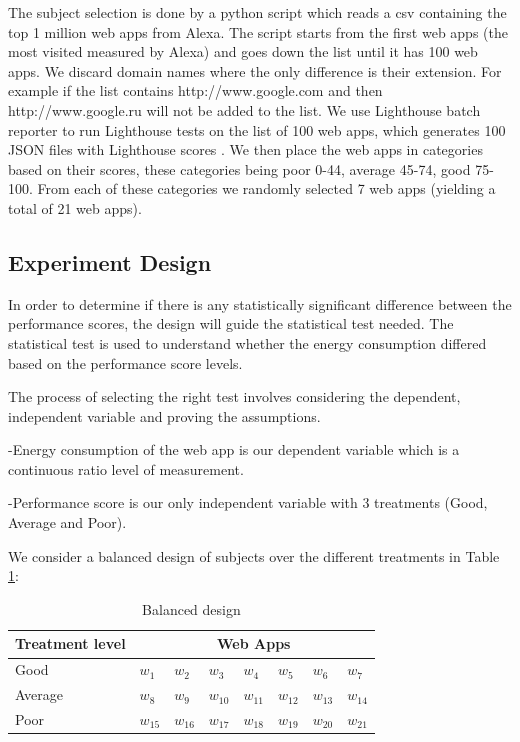 	The subject selection is done by a python script \cite{WEBSITE:11} which reads a csv containing the top 1 million web apps from Alexa. The script starts from the first web apps (the most visited measured by Alexa) and goes down the list until it has 100 web apps. We discard domain names where the only difference is their extension. For example if the list contains http://www.google.com and then http://www.google.ru will not be added to the list.
We use Lighthouse batch reporter to run Lighthouse tests on the list of 100 web apps, which generates 100 JSON files with Lighthouse scores \cite{WEBSITE:12}. 
We then place the web apps in categories based on their scores, these categories being poor 0-44, average 45-74, good 75-100. From each of these categories we randomly selected 7 web apps (yielding a total of 21 web apps). \newline
	
\subsection{Experiment Design}


In order to determine if there is any statistically significant
difference between the performance scores, the design will guide the statistical test needed. The statistical test is used to understand whether the energy consumption differed based on the performance score levels.

The process of selecting the right test involves considering the dependent, independent variable and proving the assumptions. 

-Energy consumption of the web app is our dependent variable which is a continuous ratio level of measurement.

-Performance score is our only independent variable with 3 treatments (Good, Average and Poor). \newline

We consider a balanced design of subjects over the different treatments in Table \ref{tab:design}: 


\begin{table}[h!]
\begin{tabular}{|l|l|l|l|l|l|l|l|}\hline
\textbf{Treatment level} &  \multicolumn{7}{|c|}{\textbf{Web Apps}} \\\hline
  Good & $w_1$ & $w_2$ & $w_3$ & $w_4$ & $w_5$ & $w_6$ & $w_7$ \\\hline
  Average & $w_8$ & $w_9$ & $w_{10}$ & $w_{11}$ & $w_{12}$ & $w_{13}$ & $w_{14}$ \\\hline
  Poor & $w_{15}$ & $w_{16}$ & $w_{17}$ & $w_{18}$ & $w_{19}$ & $w_{20}$ & $w_{21}$ \\\hline
    \end{tabular}
       \caption{Balanced design}
    \label{tab:design}
\end{table}

